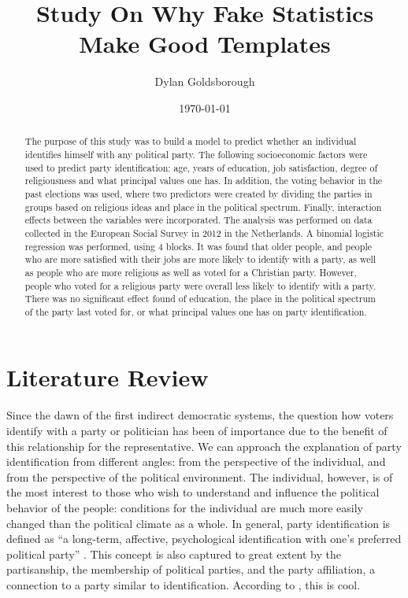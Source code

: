 \documentclass{stats_apa_style2}
\title{Study On Why Fake Statistics Make Good Templates}
\author{Dylan Goldsborough}
\date{\today}
\begin{document}
\maketitle

\begin{abstract}
\noindent
The purpose of this study was to build a model to predict whether an individual identifies himself with any political party. The following socioeconomic factors were used to predict party identification: age, years of education, job satisfaction, degree of religiousness and what principal values one has. In addition, the voting behavior in the past elections was used, where two predictors were created by dividing the parties in groups based on religious ideas and place in the political spectrum. Finally, interaction effects between the variables were incorporated. The analysis was performed on data collected in the European Social Survey in 2012 in the Netherlands. A binomial logistic regression was performed, using 4 blocks. It was found that older people, and people who are more satisfied with their jobs are more likely to identify with a party, as well as people who are more religious as well as voted for a Christian party. However, people who voted for a religious party were overall less likely to identify with a party. There was no significant effect found of education, the place in the political spectrum of the party last voted for, or what principal values one has on party identification.
\end{abstract}

\newpage

\section*{Literature Review}

Since the dawn of the first indirect democratic systems, the question how voters identify with a party or politician has been of importance due to the benefit of this relationship for the representative. We can approach the explanation of party identification from different angles: from the perspective of the individual, and from the perspective of the political environment. The individual, however, is of the most interest to those who wish to understand and influence the political behavior of the people: conditions for the individual are much more easily changed than the political climate as a whole.
In general, party identification is defined as “a long-term, affective, psychological identification with one’s preferred political party” \cite[p.20]{mcboat2016cool}. This concept is also captured to great extent by the partisanship, the membership of political parties, and the party affiliation, a connection to a party similar to identification. According to , this is cool.
\end{document}
